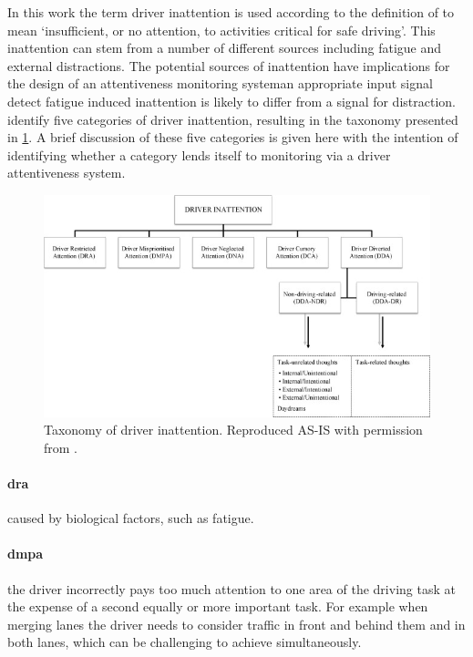 \documentclass[11pt, parskip=half*,twoside=false]{scrbook}
\begin{document}
In this work the term driver inattention is used according to the definition of \citet{reganDriverDistractionDriver2011} to mean `insufficient, or no attention, to activities critical for safe driving'. This inattention can stem from a number of different sources including fatigue and external distractions. The potential sources of inattention have implications for the design of an attentiveness monitoring system\textemdash an appropriate input signal detect fatigue induced inattention is likely to differ from a signal for distraction.  \citet{reganDriverDistractionDriver2011} identify five categories of driver inattention, resulting in the taxonomy presented in \cref{fig:taxonomy_inattention}. A brief discussion of these five categories is given here with the intention of identifying whether a category lends itself to monitoring via a driver attentiveness system. 

\begin{figure}[h]
	\centering
	\includegraphics[width=\textwidth]{driver_inattention_taxonomy} 
	\caption{Taxonomy of driver inattention. Reproduced AS-IS with permission from \citep{reganDriverDistractionDriver2011}.}
	\label{fig:taxonomy_inattention}
\end{figure}

\paragraph{\gls{dra}}caused by biological factors, such as fatigue. 

\paragraph{\gls{dmpa}} the driver incorrectly pays too much attention to one area of the driving task at the expense of a second equally or more important task. For example when merging lanes the driver needs to consider traffic in front and behind them and in both lanes, which can be challenging to achieve simultaneously.
\end{document}
